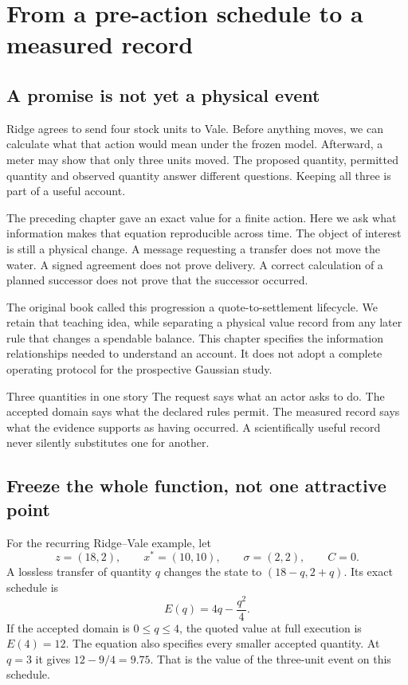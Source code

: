 \chapter{From a pre-action schedule to a measured record}\label{ch:lifecycle}

\section{A promise is not yet a physical event}
Ridge agrees to send four stock units to Vale. Before anything moves, we can calculate what that action would mean under the frozen model. Afterward, a meter may show that only three units moved. The proposed quantity, permitted quantity and observed quantity answer different questions. Keeping all three is part of a useful account.

The preceding chapter gave an exact value for a finite action. Here we ask what information makes that equation reproducible across time. The object of interest is still a physical change. A message requesting a transfer does not move the water. A signed agreement does not prove delivery. A correct calculation of a planned successor does not prove that the successor occurred.

The original book called this progression a quote-to-settlement lifecycle. We retain that teaching idea, while separating a physical value record from any later rule that changes a spendable balance. This chapter specifies the information relationships needed to understand an account. It does not adopt a complete operating protocol for the prospective Gaussian study.

\begin{intuitionbox}{Three quantities in one story}
The request says what an actor asks to do. The accepted domain says what the declared rules permit. The measured record says what the evidence supports as having occurred. A scientifically useful record never silently substitutes one for another.
\end{intuitionbox}

\section{Freeze the whole function, not one attractive point}
For the recurring Ridge--Vale example, let
\[
 z=(18,2),\qquad x^*=(10,10),\qquad \sigma=(2,2),\qquad C=0.
\]
A lossless transfer of quantity $q$ changes the state to $(18-q,2+q)$. Its exact schedule is
\begin{equation}
 E(q)=4q-\frac{q^2}{4}.
\end{equation}
If the accepted domain is $0\le q\le4$, the quoted value at full execution is $E(4)=12$. The equation also specifies every smaller accepted quantity. At $q=3$ it gives $12-9/4=9.75$. That is the value of the three-unit event on this schedule.

